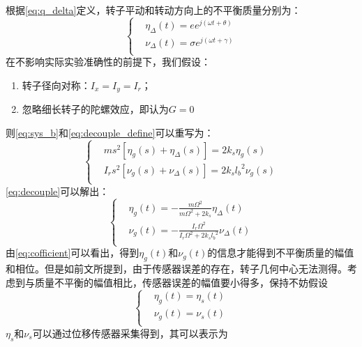根据\autoref{eq:q_delta}定义，转子平动和转动方向上的不平衡质量分别为：
\begin{equation}
\label{eq:eta_nu_define}
\left\{
\begin{aligned}
&\eta _{\Delta}(t) = ee^{j(\omega t + \theta)} \\
&\nu _{\Delta}(t) = \sigma e^{j(\omega t + \gamma)} \\
\end{aligned}
\right.
\end{equation}
在不影响实际实验准确性的前提下，我们假设：
\begin{enumerate}
	\item 转子径向对称：$I_x = I_y = I_r$；
	\item 忽略细长转子的陀螺效应，即认为$G = 0$
\end{enumerate}
则\autoref{eq:sys_b}和\autoref{eq:decouple_define}可以重写为：
\begin{equation}
\label{eq:decouple}
\left\{
\begin{aligned}
& ms^2\left[ \eta _g(s)+\eta_{\Delta}(s) \right] = 2k_s\eta _g(s)\\
& {I_r}s^2\left[ \nu _g(s)+\nu_{\Delta}(s) \right] = 2k_s{l_b}^2\nu _g(s)\\
\end{aligned}
\right.
\end{equation}
\autoref{eq:decouple}可以解出：
\begin{equation}
\label{eq:cofficient}
\left\{
\begin{aligned}
& \eta _g (t) = -\frac{m{\Omega}^2}{m{\Omega}^2+2k_s}\eta _{\Delta}(t)\\
& \nu _g (t) = -\frac{I_r{\Omega}^2}{I_r{\Omega}^2+2k_s{l_b}^2}\nu _{\Delta}(t)\\
\end{aligned}
\right.
\end{equation}
由\autoref{eq:cofficient}可以看出，得到$\eta _g(t)$和$\nu _g(t)$的信息才能得到不平衡质量的幅值和相位。但是如前文所提到，由于传感器误差的存在，转子几何中心无法测得。考虑到与质量不平衡的幅值相比，传感器误差的幅值要小得多，保持不妨假设
\begin{equation}
\label{eq:assumption}
\left\{
\begin{aligned}
& \eta _g (t) = \eta _s (t)\\
& \nu _g (t) = \nu _s (t)  \\
\end{aligned}
\right.
\end{equation}
$\eta _s$和$\nu _s$可以通过位移传感器采集得到，其可以表示为
